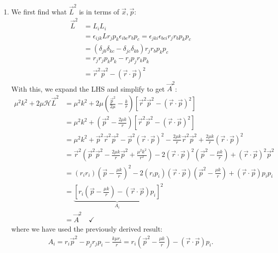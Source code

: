 \documentclass{article}
\theoremstyle{definition}
\newcommand{\ham}{\mathcal{H}}
\newcommand{\f}[2]{\frac{#1}{#2}}
\newcommand{\lp}{\left(}
\newcommand{\rp}{\right)}
\newcommand{\lb}{\left[}
\newcommand{\rb}{\right]}
\begin{document}
\begin{enumerate}[label=(\alph*)]
	\item We first find what $\vec{L}^2$ is in terms of $\vec{x}, \vec{p}$:
	\begin{align*}
	\vec{L}^2 &= L_i L_i\\
	&= \epsilon_{ijk}Lr_jp_k \epsilon_{ibc}r_bp_c = \epsilon_{jki}\epsilon_{bci}r_jr_bp_kp_c\\
	&= (\delta_{jb}\delta_{kc} - \delta_{jc}\delta_{kb})r_jr_bp_kp_c \\
	&= r_jr_jp_kp_k - r_jp_j r_k p_k \\
	&= \vec{r}^2\vec{p}^2 - (\vec{r}\cdot \vec{p})^2
	\end{align*}
	With this, we expand the LHS and simplify to get $\vec{A}^2$:
	\begin{align*}
	\mu^2 k^2 + 2\mu \ham \vec{L}^2 
	&= \mu^2k^2 + 2\mu \lp \f{\vec{p}^2}{2\mu} - \f{k}{r} \rp \lb \vec{r}^2\vec{p}^2 - (\vec{r}\cdot \vec{p})^2 \rb \\ 
	&= \mu^2 k^2 +  \lp \vec{p}^2 - \f{2\mu k }{r} \rp \lb \vec{r}^2\vec{p}^2 - (\vec{r}\cdot \vec{p})^2 \rb \\
	&= \mu^2k^2 + \vec{p}^2 \vec{r}^2 \vec{p}^2 - \vec{p}^2 (\vec{r}\cdot \vec{p})^2 - \f{2\mu k }{r}\vec{r}^2 \vec{p}^2  + \f{2\mu k }{r} (\vec{r}\cdot \vec{p})^2 \\
	&= \vec{r}^2 \lp \vec{p}^2 \vec{p}^2 - \f{2\mu k }{r}\vec{p}^2 + \f{\mu^2 k^2}{r^2}\rp -2 (\vec{r}\cdot \vec{p} )^2 \lp \vec{p}^2- \f{\mu k }{r} \rp  + (\vec{r}\cdot \vec{p})^2\vec{p}^2\\
	&= (r_ir_i)\lp \vec{p} - \f{\mu k }{r} \rp^2 -2 (r_ip_i)(\vec{r}\cdot \vec{p}) \lp \vec{p}^2- \f{\mu k }{r} \rp  + (\vec{r}\cdot{\vec{p}}) p_i p_i\\ 
	&= {\underbrace{\lb  r_i\lp \vec{p} - \f{\mu k }{r} \rp - (\vec{r}\cdot \vec{p}) p_i  \rb}_{A_i}}^2\\
	&= \vec{A}^2 \quad\checkmark
	\end{align*}
	where we have used the previously derived result:
	\begin{align*}
	A_i = r_i\vec{p}^2 - p_jr_j p_i - \f{k\mu r_i}{r} = r_i \lp \vec{p}^2 - \f{\mu k }{r} \rp - (\vec{r}\cdot \vec{p}) p_i.
	\end{align*}
\end{enumerate}
\end{document}
